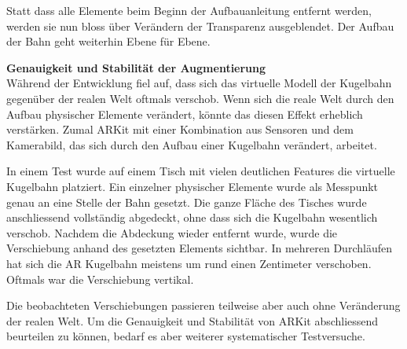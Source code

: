 \begin{description}
	Statt dass alle Elemente beim Beginn der Aufbauanleitung entfernt werden, werden sie nun bloss über Verändern der Transparenz ausgeblendet. Der Aufbau der Bahn geht weiterhin Ebene für Ebene.

	\textbf{Genauigkeit und Stabilität der Augmentierung}\\
	Während der Entwicklung fiel auf, dass sich das virtuelle Modell der Kugelbahn gegenüber der realen Welt oftmals verschob. Wenn sich die reale Welt durch den Aufbau physischer Elemente verändert, könnte das diesen Effekt erheblich verstärken. Zumal ARKit mit einer Kombination aus Sensoren und dem Kamerabild, das sich durch den Aufbau einer Kugelbahn verändert, arbeitet.

	In einem Test wurde auf einem Tisch mit vielen deutlichen Features die virtuelle Kugelbahn platziert. Ein einzelner physischer Elemente wurde als Messpunkt genau an eine Stelle der Bahn gesetzt. Die ganze Fläche des Tisches wurde anschliessend vollständig abgedeckt, ohne dass sich die Kugelbahn wesentlich verschob. Nachdem die Abdeckung wieder entfernt wurde, wurde die Verschiebung anhand des gesetzten Elements sichtbar. In mehreren Durchläufen hat sich die AR Kugelbahn meistens um rund einen Zentimeter verschoben. Oftmals war die Verschiebung vertikal.

	Die beobachteten Verschiebungen passieren teilweise aber auch ohne Veränderung der realen Welt.
	Um die Genauigkeit und Stabilität von ARKit abschliessend beurteilen zu können, bedarf es aber weiterer systematischer Testversuche.

\end{description}
